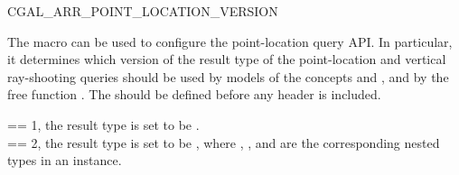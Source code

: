 \begin{ccRefMacro}{CGAL_ARR_POINT_LOCATION_VERSION}

\ccDefinition
The macro  can be used to configure
the point-location query API. In particular, it determines which version
of the result type of the point-location and vertical ray-shooting queries
should be used by models of the concepts 
and , and by the free function
. The \ccRefName{} should be defined before any \cgal{} header
is included.

 == 1, the result type is set to be
  .\\
 == 2, the result type is set to be
, where , , and
 are the corresponding nested types in an
 instance.

\ccSeeAlso
\\
\\

\end{ccRefMacro}
